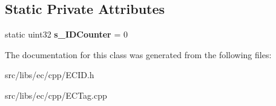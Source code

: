 \subsection*{Static Private Attributes}
\begin{DoxyCompactItemize}
\item 
static uint32 {\bfseries s\_\-IDCounter} = 0\label{classCECID_ab81cc213cd38ef0d30f864f7e3cd03c7}

\end{DoxyCompactItemize}


The documentation for this class was generated from the following files:\begin{DoxyCompactItemize}
\item 
src/libs/ec/cpp/ECID.h\item 
src/libs/ec/cpp/ECTag.cpp\end{DoxyCompactItemize}

